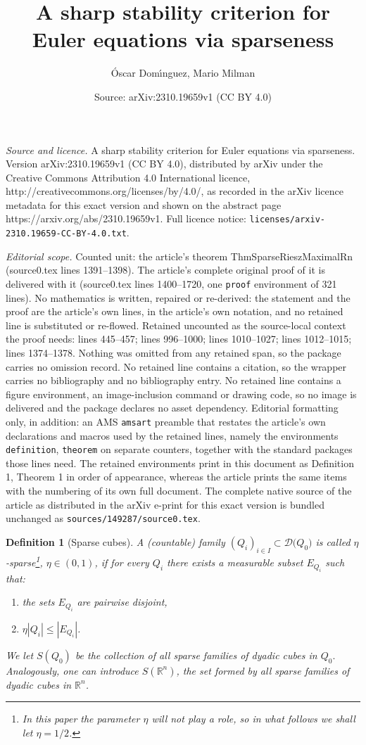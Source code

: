 \documentclass[10pt,a4paper]{amsart}
\title{A sharp stability criterion for Euler equations via sparseness}
\author{\'{O}scar Dom\'{\i}nguez, Mario Milman}
\date{Source: arXiv:2310.19659v1 (CC BY 4.0)}
\newtheorem{definition}{Definition}
\def\R{\mathbb{R}}
\begin{document}
\maketitle

\noindent\emph{Source and licence.} A sharp stability criterion for Euler equations via sparseness. Version arXiv:2310.19659v1 (CC BY 4.0), distributed by arXiv under the Creative Commons Attribution 4.0 International licence, http://creativecommons.org/licenses/by/4.0/, as recorded in the arXiv licence metadata for this exact version and shown on the abstract page https://arxiv.org/abs/2310.19659v1. Full licence notice: \texttt{licenses/arxiv-2310.19659-CC-BY-4.0.txt}.\par\smallskip

\noindent\textit{Editorial scope.} Counted unit: the article's theorem ThmSparseRieszMaximalRn (source0.tex lines 1391--1398). The article's complete original proof of it is delivered with it (source0.tex lines 1400--1720, one \texttt{proof} environment of 321 lines). No mathematics is written, repaired or re-derived: the statement and the proof are the article's own lines, in the article's own notation, and no retained line is substituted or re-flowed.  Retained uncounted as the source-local context the proof needs: lines 445--457; lines 996--1000; lines 1010--1027; lines 1012--1015; lines 1374--1378.  Nothing was omitted from any retained span, so the package carries no omission record.  No retained line contains a citation, so the wrapper carries no bibliography and no bibliography entry.  No retained line contains a figure environment, an image-inclusion command or drawing code, so no image is delivered and the package declares no asset dependency.  Editorial formatting only, in addition: an AMS \texttt{amsart} preamble that restates the article's own declarations and macros used by the retained lines, namely the environments \texttt{definition}, \texttt{theorem} on separate counters, together with the standard packages those lines need.  The retained environments print in this document as Definition 1, Theorem 1 in order of appearance, whereas the article prints the same items with the numbering of its own full document.  The complete native source of the article as distributed in the arXiv e-print for this exact version is bundled unchanged as \texttt{sources/149287/source0.tex}.
\begin{definition}[Sparse cubes]
\label{DefnSparse} A  (countable) family $(Q_{i})_{i\in
I} \subset \mathcal{D(}Q_{0})$ is called \emph{$\eta
$-sparse\footnote{In this paper the parameter $\eta$ will not play a role,
so in what follows we shall let $\eta=1/2$.}}, $\eta\in(0,1)$, if for every
$Q_{i}$ there exists a measurable subset $E_{Q_{i}}$ such that:
\begin{enumerate}
\item[(i)] the sets $E_{Q_{i}}$ are pairwise disjoint,
\item[(ii)] $\eta |Q_{i}|\leq|E_{Q_{i}}|$.
\end{enumerate}
We let $S(Q_{0})$ be the collection of all sparse families of
dyadic cubes in $Q_{0}.$ Analogously, one can introduce $S(\R^n)$, the set formed by all sparse  families of dyadic cubes in $\R^n$. 
\end{definition}
\end{document}
